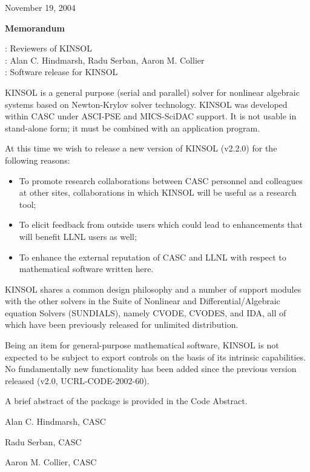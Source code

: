 \documentclass[12pt]{letter}
\begin{document}
\pagestyle{empty}

\begin{letter}

\hfill November 19, 2004

\vspace{0.2in}
\centerline{\bf Memorandum}

: Reviewers of KINSOL \\
: Alan C. Hindmarsh, Radu Serban, Aaron M. Collier \\
: Software release for KINSOL

KINSOL is a general purpose (serial and parallel) solver for nonlinear algebraic 
systems based on  Newton-Krylov solver technology.
KINSOL was developed within CASC under ASCI-PSE and MICS-SciDAC support. 
It is not usable in stand-alone form; it must be combined with an application program.

At this time we wish to release a new version of KINSOL (v2.2.0) for the 
following reasons:
\begin{itemize}
\item To promote research collaborations between CASC personnel and colleagues at 
      other sites, collaborations in which KINSOL will be useful as a research tool;
\item To elicit feedback from outside users which could lead to enhancements that will 
      benefit LLNL users as well;
\item To enhance the external reputation of CASC and LLNL with respect to 
      mathematical software written here.
\end{itemize}

KINSOL shares a common design philosophy and a number of support modules with the 
other solvers in the Suite of Nonlinear and Differential/Algebraic equation Solvers (SUNDIALS), 
namely CVODE, CVODES, and IDA, all of which have been previously released for unlimited 
distribution.

Being an item for general-purpose mathematical software, KINSOL is not expected to be 
subject to export controls on the basis of its intrinsic capabilities. 
No fundamentally new functionality has been added since the previous version released
(v2.0, UCRL-CODE-2002-60).

A brief abstract of the package is provided in the Code Abstract. 


\vspace{0.5in}                 
\hfill Alan C. Hindmarsh, CASC

\vspace{0.5in}                 
\hfill Radu Serban, CASC

\vspace{0.5in}                 
\hfill Aaron M. Collier, CASC

\end{letter}
\end{document}
